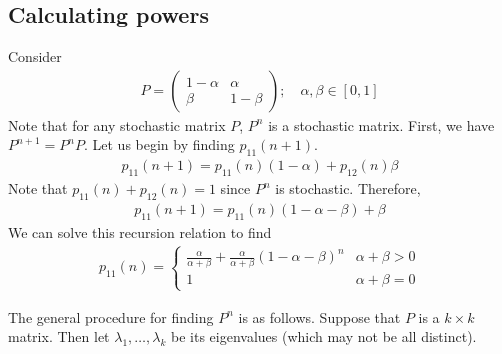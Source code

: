 \subsection{Calculating powers}
\begin{example}
	Consider
	\begin{align*}
		P = \begin{pmatrix}
			1-\alpha & \alpha \\ \beta & 1-\beta
		\end{pmatrix};\quad \alpha, \beta \in [0,1]
	\end{align*}
	Note that for any stochastic matrix $P$, $P^n$ is a stochastic matrix.
	First, we have $P^{n+1} = P^n P$.
	Let us begin by finding $p_{11}(n+1)$.
	\begin{align*}
		p_{11}(n+1) = p_{11}(n)(1-\alpha) + p_{12}(n)\beta
	\end{align*}
	Note that $p_{11}(n) + p_{12}(n) = 1$ since $P^n$ is stochastic.
	Therefore,
	\begin{align*}
		p_{11}(n+1) = p_{11}(n)(1-\alpha-\beta) + \beta
	\end{align*}
	We can solve this recursion relation to find
	\begin{align*}
		p_{11}(n) = \begin{cases}
			\frac{\alpha}{\alpha + \beta} + \frac{\alpha}{\alpha + \beta}(1-\alpha-\beta)^n & \alpha + \beta > 0 \\
			1                                                                               & \alpha + \beta = 0\end{cases}
	\end{align*}
\end{example}
\noindent The general procedure for finding $P^n$ is as follows.
Suppose that $P$ is a $k \times k$ matrix.
Then let $\lambda_1, \dots, \lambda_k$ be its eigenvalues (which may not be all distinct).
